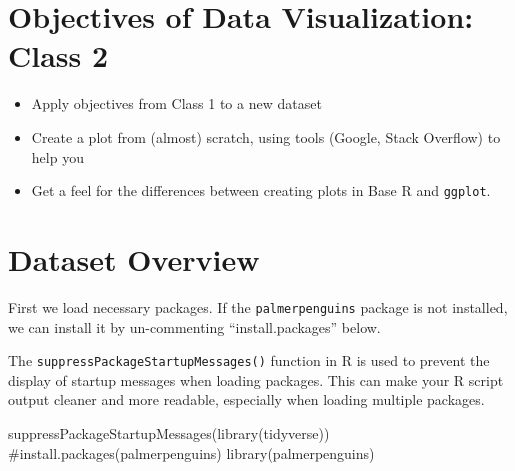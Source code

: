 \documentclass[
  letterpaper,
  DIV=11,
  numbers=noendperiod]{scrreprt}
\newenvironment{Shaded}{\begin{snugshade}}{\end{snugshade}}
\newcommand{\CommentTok}[1]{\textcolor[rgb]{0.37,0.37,0.37}{#1}}
\newcommand{\FunctionTok}[1]{\textcolor[rgb]{0.28,0.35,0.67}{#1}}
\newcommand{\NormalTok}[1]{\textcolor[rgb]{0.00,0.23,0.31}{#1}}
\begin{document}
\hypertarget{objectives-of-data-visualization-class-2}{%
\section{Objectives of Data Visualization: Class
2}\label{objectives-of-data-visualization-class-2}}

\begin{itemize}
\item
  Apply objectives from Class 1 to a new dataset
\item
  Create a plot from (almost) scratch, using tools (Google, Stack
  Overflow) to help you
\item
  Get a feel for the differences between creating plots in Base R and
  \texttt{ggplot}.
\end{itemize}

\hypertarget{dataset-overview}{%
\section{Dataset Overview}\label{dataset-overview}}

First we load necessary packages. If the \texttt{palmerpenguins} package
is not installed, we can install it by un-commenting
``install.packages'' below.

\begin{tcolorbox}[enhanced jigsaw, left=2mm, colframe=quarto-callout-tip-color-frame, leftrule=.75mm, opacitybacktitle=0.6, toptitle=1mm, title=\textcolor{quarto-callout-tip-color}{\faLightbulb}\hspace{0.5em}{Tip}, opacityback=0, coltitle=black, colbacktitle=quarto-callout-tip-color!10!white, breakable, colback=white, titlerule=0mm, bottomrule=.15mm, arc=.35mm, bottomtitle=1mm, rightrule=.15mm, toprule=.15mm]

The \texttt{suppressPackageStartupMessages()} function in R is used to
prevent the display of startup messages when loading packages. This can
make your R script output cleaner and more readable, especially when
loading multiple packages.

\end{tcolorbox}

\begin{Shaded}
\begin{Highlighting}[]
\FunctionTok{suppressPackageStartupMessages}\NormalTok{(}\FunctionTok{library}\NormalTok{(tidyverse))}
\CommentTok{\#install.packages(\textquotesingle{}palmerpenguins\textquotesingle{})}
\FunctionTok{library}\NormalTok{(palmerpenguins)}
\end{Highlighting}
\end{Shaded}
\end{document}
